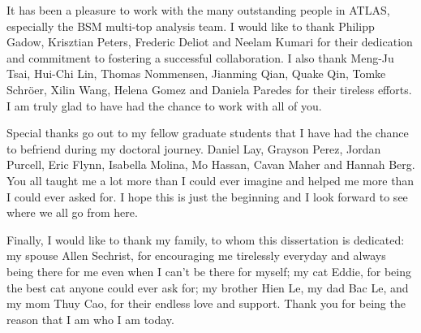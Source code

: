 \documentclass{msuphddissertation}
\begin{document}
\begin{acknowledgment}
It has been a pleasure to work with the many outstanding people in ATLAS, especially the BSM multi-top analysis team. I would like to thank Philipp Gadow, Krisztian Peters, Frederic Deliot and Neelam Kumari for their dedication and commitment to fostering a successful collaboration. I also thank Meng-Ju Tsai, Hui-Chi Lin, Thomas Nommensen, Jianming Qian, Quake Qin, Tomke Schr\"{o}er, Xilin Wang, Helena Gomez and Daniela Paredes for their tireless efforts. I am truly glad to have had the chance to work with all of you.

Special thanks go out to my fellow graduate students that I have had the chance to befriend during my doctoral journey. Daniel Lay, Grayson Perez, Jordan Purcell, Eric Flynn, Isabella Molina, Mo Hassan, Cavan Maher and Hannah Berg. You all taught me a lot more than I could ever imagine and helped me more than I could ever asked for. I hope this is just the beginning and I look forward to see where we all go from here.

Finally, I would like to thank my family, to whom this dissertation is dedicated: my spouse Allen Sechrist, for encouraging me tirelessly everyday and always being there for me even when I can't be there for myself; my cat Eddie, for being the best cat anyone could ever ask for; my brother Hien Le, my dad Bac Le, and my mom Thuy Cao, for their endless love and support. Thank you for being the reason that I am who I am today.
\end{acknowledgment}


\TOC %


\LOT

\LOF
\end{document}
